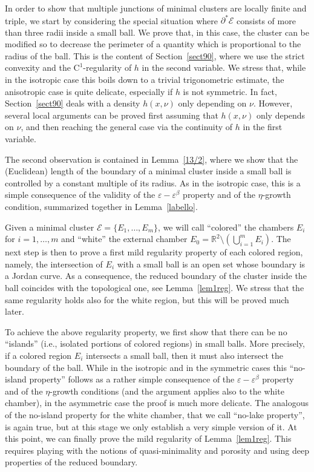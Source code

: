 \documentclass[11pt]{article}
\newcommand{\ie}{i.e.,\xspace}
\numberwithin{equation}{section}
\newcommand\R{\mathbb{R}}
\let\eps\varepsilon
\newcommand\E{\mathcal{E}}
\theoremstyle{plain}
\theoremstyle{definition}
\begin{document}
In order to show that multiple junctions of minimal clusters are locally finite and triple, we start by considering the special situation where $\partial^*\E$ consists of more than three radii inside a small ball. We prove that, in this case, the cluster can be modified so to decrease the perimeter of a quantity which is proportional to the radius of the ball. This is the content of Section~\ref{sect90}, where we use the strict convexity and the $\mathrm{C}^1$-regularity of $h$ in the second variable. We stress that, while in the isotropic case this boils down to a trivial trigonometric estimate, the anisotropic case is quite delicate, especially if $h$ is not symmetric. In fact, Section~\ref{sect90} deals with a density $h(x,\nu)$ only depending on $\nu$. However, several local arguments can be proved first assuming that $h(x,\nu)$ only depends on $\nu$, and then reaching the general case via the continuity of $h$ in the first variable.

The second observation is contained in Lemma~\ref{13/2}, where we show that the (Euclidean) length of the boundary of a minimal cluster inside a small ball is controlled by a constant multiple of its radius. As in the isotropic case, this is a simple consequence of the validity of the $\varepsilon-\varepsilon^\beta$ property and of the $\eta$-growth condition, summarized together in Lemma~\ref{labello}.

Given a minimal cluster $\mathcal E=\{E_1,\dots,E_m\}$, we will call ``colored'' the chambers $E_i$ for $i=1,\dots, m$ and ``white'' the external chamber $E_0=\R^2\setminus (\bigcup_{i=1}^mE_i)$. The next step is then to prove a first mild regularity property of each colored region, namely, the intersection of $E_i$ with a small ball is an open set whose boundary is a Jordan curve. As a consequence, the reduced boundary of the cluster inside the ball coincides with the topological one, see Lemma~\ref{lem1reg}. We stress that the same regularity holds also for the white region, but this will be proved much later.\enlargethispage{.5\baselineskip}%

To achieve the above regularity property, we first show that there can be no ``islands'' (\ie isolated portions of colored regions) in small balls. More precisely, if a colored region $E_i$ intersects a small ball, then it must also intersect the boundary of the ball. While in the isotropic and in the symmetric cases this ``no-island property'' follows as a rather simple consequence of the $\eps-\eps^\beta$ property and of the $\eta$-growth conditions (and the argument applies also to the white chamber), in the asymmetric case the proof is much more delicate. The analogous of the no-island property for the white chamber, that we call ``no-lake property'', is again true, but at this stage we only establish a very simple version of it. At this point, we can finally prove the mild regularity of Lemma~\ref{lem1reg}. This requires playing with the notions of quasi-minimality and porosity and using deep properties of the reduced boundary.
\end{document}
